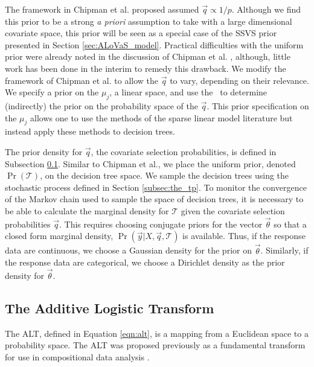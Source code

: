 The framework in Chipman et al. \cite{chipman1998bayesian} proposed assumed $\vec{q} \propto 1/p$. Although we find this prior to be a strong \emph{a priori} assumption to take with a large dimensional covariate space, this prior will be seen as a special case of the SSVS prior presented in Section \ref{sec:ALoVaS_model}. Practical difficulties with the uniform prior were already noted in the discussion of Chipman et al. \cite{knight1998bayesian}, although, little work has been done in the interim to remedy this drawback. We modify the framework of Chipman et al. to allow the $\vec{q}$ to vary, depending on their relevance. We specify a prior on the $\mu_j$, a linear space, and use the \ALT\ to determine (indirectly) the prior on the probability space of the $\vec{q}$. This prior specification on the $\mu_j$ allows one to use the methods of the sparse linear model literature but instead apply these methods to decision trees. 

The prior density for $\vec{q}$, the covariate selection probabilities, is defined in Subsection \ref{subsec:alt}. Similar to Chipman et al., we place the uniform prior, denoted $\Pr(\mathcal{T})$, on the decision tree space. We sample the decision trees using the stochastic process defined in Section \ref{subsec:the_tp}.  To monitor the convergence of the Markov chain used to sample the space of decision trees, it is necessary to be able to calculate the marginal density for $\mathcal{T}$ given the covariate selection probabilities $\vec{q}$. This requires choosing conjugate priors for the vector $\vec{\theta}$ so that a closed form marginal density, $\Pr(\vec{y}\vert X,\vec{q},\mathcal{T})$ is available. Thus, if the response data are continuous, we choose a Gaussian density for the prior on $\vec{\theta}$. Similarly, if the response data are categorical, we choose a Dirichlet density as the prior density for $\vec{\theta}$.  

	\subsection{The Additive Logistic Transform}\label{subsec:alt}
	
	The ALT, defined in Equation \ref{eqn:alt}, is a mapping from a Euclidean space to a probability space. 
	The ALT was proposed previously as a fundamental transform for use in compositional data analysis \cite{aitchison1986statistical}. 
	

